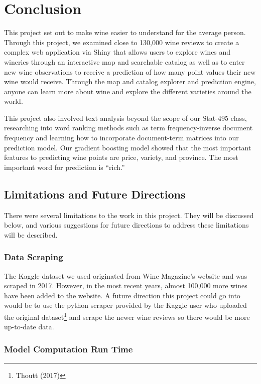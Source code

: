 \documentclass[12pt,twoside]{amherstthesis}
\begin{document}
\chapter*{Conclusion}\label{conclusion}

This project set out to make wine easier to understand for the average
person. Through this project, we examined close to 130,000 wine reviews
to create a complex web application via Shiny that allows users to
explore wines and wineries through an interactive map and searchable
catalog as well as to enter new wine observations to receive a
prediction of how many point values their new wine would receive.
Through the map and catalog explorer and prediction engine, anyone can
learn more about wine and explore the different varieties around the
world.

This project also involved text analysis beyond the scope of our
Stat-495 class, researching into word ranking methods such as term
frequency-inverse document frequency and learning how to incorporate
document-term matrices into our prediction model. Our gradient boosting
model showed that the most important features to predicting wine points
are price, variety, and province. The most important word for prediction
is ``rich.''

\section{Limitations and Future
Directions}\label{limitations-and-future-directions}

There were several limitations to the work in this project. They will be
discussed below, and various suggestions for future directions to
address these limitations will be described.

\subsection{Data Scraping}\label{data-scraping}

The Kaggle dataset we used originated from Wine Magazine's website and
was scraped in 2017. However, in the most recent years, almost 100,000
more wines have been added to the website. A future direction this
project could go into would be to use the python scraper provided by the
Kaggle user who uploaded the original dataset\footnote{Thoutt (2017)}
and scrape the newer wine reviews so there would be more up-to-date
data.

\subsection{Model Computation Run
Time}\label{model-computation-run-time}
\end{document}
